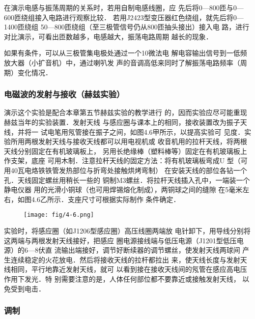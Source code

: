 在演示电感与振荡周期的关系时，若用自制电感线圈，应
先后将0—800匝与0—600匝绕组接入电路进行观察比较．
若用J2423型变压器红色绕组，就先后将0—1400匝绕组
50—800匝绕组（至三极管信号仍从800匝抽头接出）接入电
路，进行对比演示，可看出匝数越多，电感越大，振荡电路周期
越长的现象．

如果有条件，可以从三极管集电极处通过一个10微法电
解电容输出信号到一低频放大器（小扩音机）中，通过喇叭发
声的音调高低来同时了解振荡电路频率（周期）变化情况．

\subsubsection{电磁波的发射与接收（赫兹实验）}

演示这个实验是配合本章第五节赫兹实验的教学进行
的，因而实验应尽可能重现赫兹当年的实验装置．发射天线
与感应圈与课本上的相同，接收装置改为振子天线，并将一
试电笔用氖管接在振子之间，如图4.6甲所示，以提高实验可
见度．实验所用两根发射天线与接收天线都可以用电视机或
收音机用的拉杆天线，将两根天线分别固定在有机玻璃板上，
另用长绝缘棒（塑料棒等）固定在有机玻璃板上作支架，底座
可用木制．注意拉杆天线的固定方法：将有机玻璃板弯成U
型（可用40瓦电烙铁铁管发热部位与折弯处接触烘烤弯制）
在安装天线的部位各钻一个孔．天线固定螺丝用稍长一些的
铜制M3螺丝．将拉杆天线插入孔中，一端装一个静电仪器
用的光滑小铜球（也可用焊锡熔化制成），两铜球之间的缝隙
在5毫米左右，如图4.6乙所示．支座尺寸可根据实际制作
条件确定．

\begin{figure}[htp]
    \centering
\texttt{[image: fig/4-6.png]}
    \caption{}
\end{figure}

实验时，将感应圈（如J1206型感应圈）高压线圈两端放
电针卸下，用导线分别将这两端与两根发射天线接好，把感应
圈电源接线端与低压电源（J1201型低压电源）的6—8伏直
流输出端接好，调节好断续器的调节螺丝，使发射天线两球间
产生连续稳定的火花放电．然后将接收天线的拉杆都拉出
来，使天线长度与发射天线相同，平行地靠近发射天线，就可
以看到接在接收天线间的氖管在感应高电压作用下发光．特
别需要注意的是，人体任何部位都不要靠近或接触发射天线，
以免受到电击．

\subsubsection{调制}


